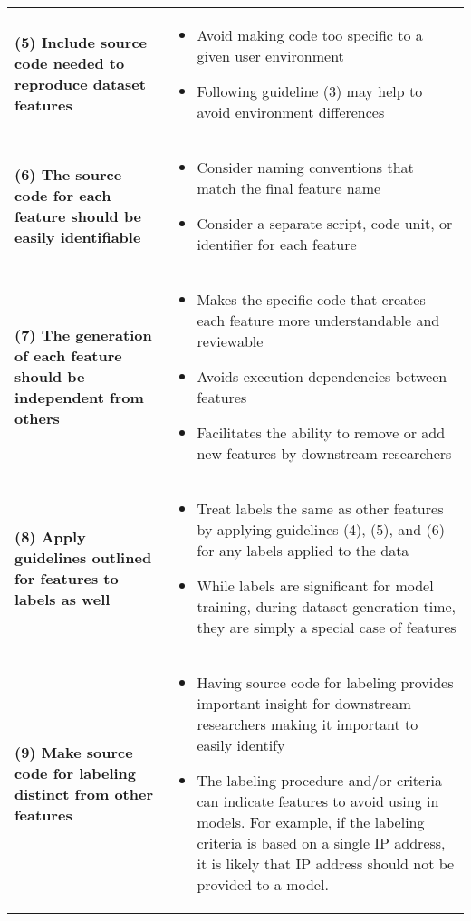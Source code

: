 \documentclass[sigconf]{acmart}
\begin{document}
\begin{table*}
\begin{tabular}{m{8cm} m{8cm}}
    \textbf{(5) Include source code needed to reproduce dataset features} &
    \begin{itemize}
        \item Avoid making code too specific to a given user environment
        \item Following guideline (3) may help to avoid environment differences
    \end{itemize} \\

    \textbf{(6) The source code for each feature should be easily identifiable} &
    \begin{itemize}
        \item Consider naming conventions that match the final  feature name
        \item Consider a separate script, code unit, or identifier for each feature
    \end{itemize} \\

    \textbf{(7) The generation of each feature should be independent from others} &
    \begin{itemize}
        \item Makes the specific code that creates each feature more understandable and reviewable
        \item Avoids execution dependencies between features
        \item Facilitates the ability to remove or add new features by downstream researchers
    \end{itemize} \\

    \textbf{(8) Apply guidelines outlined for features to labels as well} &
    \begin{itemize}
        \item Treat labels the same as other features by applying guidelines (4), (5), and (6) for any labels applied to the data
        \item While labels are significant for model training, during dataset generation time, they are simply a special case of features
    \end{itemize} \\

    \textbf{(9) Make source code for labeling distinct from other features} &
    \begin{itemize}
        \item Having source code for labeling provides important insight for downstream researchers making it important to easily identify
        \item The labeling procedure and/or criteria can indicate features to avoid using in models.
              For example, if the labeling criteria is based on a single IP address, it is likely that IP address should not be provided to a model.
    \end{itemize} \\


\end{tabular}
\end{table*}
\end{document}
